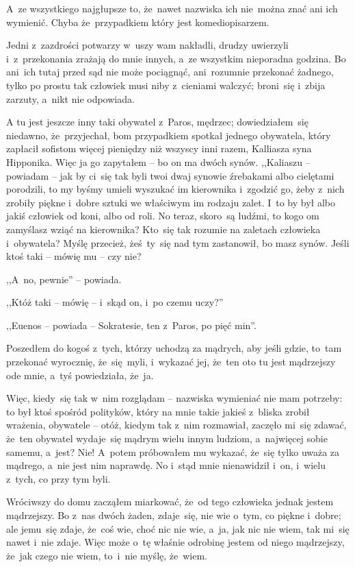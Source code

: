 A~ze wszystkiego najgłupsze to, że~nawet nazwiska ich nie~można znać
ani ich wymienić. Chyba że~przypadkiem który jest komediopisarzem.

Jedni z~zazdrości potwarzy w~uszy wam nakładli, drudzy uwierzyli
i~z~przekonania zrażają do mnie innych, a~ze wszystkim nieporadna
godzina. Bo ani~ich tutaj przed sąd nie może pociągnąć, ani~rozumnie
przekonać żadnego, tylko po prostu tak człowiek musi niby z~cieniami
walczyć; broni~się i~zbija zarzuty, a~nikt nie odpowiada.



A tu jest jeszcze inny taki obywatel z~Paros, mędrzec;
dowiedziałem~się niedawno, że~przyjechał, bom przypadkiem spotkał
jednego obywatela, który zapłacił sofistom więcej pieniędzy niż
wszyscy inni razem, Kalliasza syna Hipponika. Więc ja go zapytałem --
bo on ma dwóch synów. ,,Kaliaszu -- powiadam -- jak by ci~się tak byli
twoi dwaj synowie źrebakami albo cielętami porodzili, to my byśmy
umieli wyszukać im kierownika i~zgodzić go, żeby z~nich zrobiły piękne
i~dobre sztuki we właściwym im rodzaju zalet. I~to by był albo jakiś
człowiek od koni, albo od roli. No teraz, skoro~są ludźmi, to kogo om
zamyślasz wziąć na kierownika? Kto~się tak rozumie na zaletach
człowieka i~obywatela? Myślę przecież, żeś~ty~się nad tym zastanowił,
bo masz synów. Jeśli ktoś taki -- mówię mu -- czy nie?

,,A~no, pewnie'' -- powiada.

,,Któż taki -- mówię -- i~skąd on, i~po czemu uczy?''

,,Euenos -- powiada -- Sokratesie, ten z~Paros, po pięć min''.



Poszedłem do kogoś z~tych, którzy uchodzą za mądrych, aby jeśli gdzie,
to~tam przekonać wyrocznię, że~się~myli, i~wykazać jej, że~ten oto tu
jest mądrzejszy ode mnie, a~tyś powiedziała, że~ja.

Więc, kiedy~się tak w~nim rozglądam -- nazwiska wymieniać nie mam
potrzeby: to był ktoś spośród polityków, który na mnie takie jakieś
z~bliska zrobił wrażenia, obywatele -- otóż, kiedym tak z~nim
rozmawiał, zaczęło mi~się zdawać, że~ten obywatel wydaje~się mądrym
wielu innym ludziom, a~najwięcej sobie samemu, a~jest? Nie! A~potem
próbowałem mu wykazać, że~się tylko uważa za mądrego, a~nie jest nim
naprawdę. No i~stąd mnie nienawidził i~on, i~wielu z~tych, co przy tym
byli.

Wróciwszy do domu zacząłem miarkować, że~od tego człowieka jednak
jestem mądrzejszy. Bo z~nas dwóch żaden, zdaje~się, nie wie o~tym, co
piękne i~dobre; ale jemu~się zdaje, że~coś wie, choć nic nie wie,
a~ja, jak nic nie wiem, tak mi~się nawet i~nie zdaje. Więc może o~tę
właśnie odrobinę jestem od niego mądrzejszy, że~jak czego nie wiem,
to~i~nie myślę, że~wiem.

